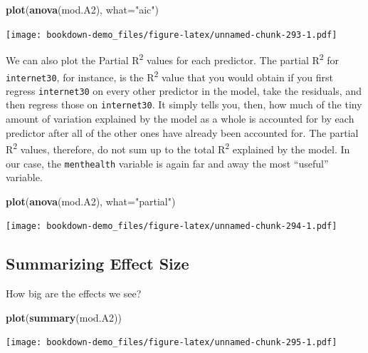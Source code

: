 \documentclass[]{book}
\newenvironment{Shaded}{\begin{snugshade}}{\end{snugshade}}
\newcommand{\KeywordTok}[1]{\textcolor[rgb]{0.13,0.29,0.53}{\textbf{#1}}}
\newcommand{\DataTypeTok}[1]{\textcolor[rgb]{0.13,0.29,0.53}{#1}}
\newcommand{\StringTok}[1]{\textcolor[rgb]{0.31,0.60,0.02}{#1}}
\newcommand{\NormalTok}[1]{#1}
\theoremstyle{definition}
\theoremstyle{definition}
\theoremstyle{definition}
\theoremstyle{remark}
\begin{document}
\begin{Shaded}
\begin{Highlighting}[]
\KeywordTok{plot}\NormalTok{(}\KeywordTok{anova}\NormalTok{(mod.A2), }\DataTypeTok{what=}\StringTok{"aic"}\NormalTok{)}
\end{Highlighting}
\end{Shaded}

\texttt{[image: bookdown-demo\_files/figure-latex/unnamed-chunk-293-1.pdf]}

We can also plot the Partial R\textsuperscript{2} values for each
predictor. The partial R\textsuperscript{2} for \texttt{internet30}, for
instance, is the R\textsuperscript{2} value that you would obtain if you
first regress \texttt{internet30} on every other predictor in the model,
take the residuals, and then regress those on \texttt{internet30}. It
simply tells you, then, how much of the tiny amount of variation
explained by the model as a whole is accounted for by each predictor
after all of the other ones have already been accounted for. The partial
R\textsuperscript{2} values, therefore, do not sum up to the total
R\textsuperscript{2} explained by the model. In our case, the
\texttt{menthealth} variable is again far and away the most ``useful''
variable.

\begin{Shaded}
\begin{Highlighting}[]
\KeywordTok{plot}\NormalTok{(}\KeywordTok{anova}\NormalTok{(mod.A2), }\DataTypeTok{what=}\StringTok{"partial"}\NormalTok{)}
\end{Highlighting}
\end{Shaded}

\texttt{[image: bookdown-demo\_files/figure-latex/unnamed-chunk-294-1.pdf]}

\subsection{Summarizing Effect Size}\label{summarizing-effect-size-2}

How big are the effects we see?

\begin{Shaded}
\begin{Highlighting}[]
\KeywordTok{plot}\NormalTok{(}\KeywordTok{summary}\NormalTok{(mod.A2))}
\end{Highlighting}
\end{Shaded}

\texttt{[image: bookdown-demo\_files/figure-latex/unnamed-chunk-295-1.pdf]}
\end{document}
